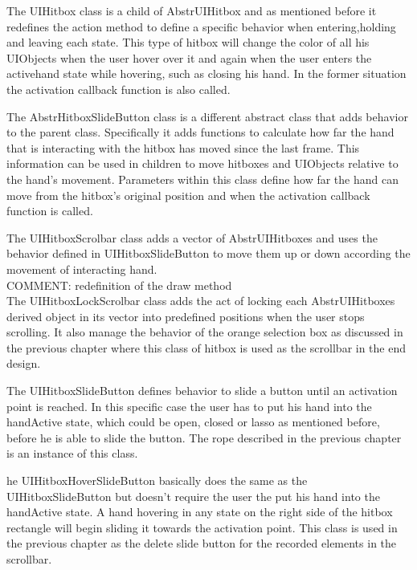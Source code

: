 The UI\textunderscore Hitbox class is a child of Abstr\textunderscore UI\textunderscore Hitbox and as mentioned before it redefines the action method to define a specific behavior when entering,holding and leaving each state. This type of hitbox will change the color of all his UI\textunderscore Objects when the user hover over it and again when the user enters the activehand state while hovering, such as closing his hand. In the former situation the activation callback function is also called.

The Abstr\textunderscore HitboxSlideButton class is a different abstract class that adds behavior to the parent class. Specifically it adds functions to calculate how far the hand that is interacting with the hitbox has moved since the last frame. This information can be used in children to move hitboxes and UI\textunderscore Objects relative to the hand's movement. Parameters within this class define how far the hand can move from the hitbox's original position and when the activation callback function is called.

The UI\textunderscore HitboxScrolbar class adds a vector of Abstr\textunderscore UI\textunderscore Hitboxes and uses the behavior defined in UI\textunderscore HitboxSlideButton to move them up or down according the movement of interacting hand. \\
{\large COMMENT: redefinition of the draw method} \\

The UI\textunderscore HitboxLockScrolbar class adds the act of locking each Abstr\textunderscore UI\textunderscore Hitboxes derived object in its vector into predefined positions when the user stops scrolling. It also manage the behavior of the orange selection box as discussed in the previous chapter where this class of hitbox is used as the scrollbar in the end design.

The UI\textunderscore HitboxSlideButton defines behavior to slide a button until an activation point is reached. In this specific case the user has to put his hand into the handActive state, which could be open, closed or lasso as mentioned before, before he is able to slide the button. The rope described in the previous chapter is an instance of this class.

he UI\textunderscore HitboxHoverSlideButton basically does the same as the UI\textunderscore HitboxSlideButton but doesn't require the user the put his hand into the handActive state. A hand hovering in any state on the right side of the hitbox rectangle will begin sliding it towards the activation point. This class is used in the previous chapter as the delete slide button for the recorded elements in the scrollbar.

